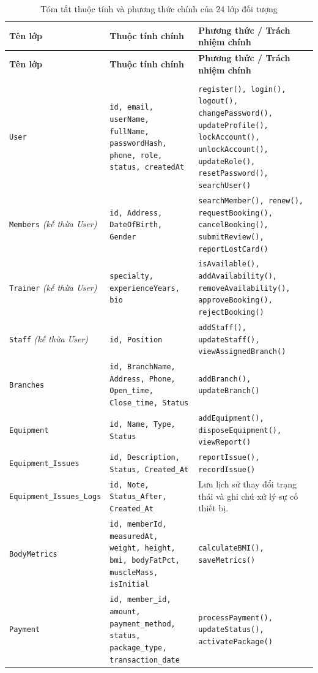\documentclass[a4paper,12pt]{article}
\begin{document}
{\small
\setlength{\tabcolsep}{4pt}
\begin{longtable}{|L{3.4cm}|L{5.3cm}|L{6.5cm}|}
\hline
\textbf{Tên lớp} & \textbf{Thuộc tính chính} & \textbf{Phương thức / Trách nhiệm chính} \\ \hline
\endfirsthead
\hline
\textbf{Tên lớp} & \textbf{Thuộc tính chính} & \textbf{Phương thức / Trách nhiệm chính} \\ \hline
\endhead
\hline
\endfoot
\hline
\caption{Tóm tắt thuộc tính và phương thức chính của 24 lớp đối tượng} \\
\endlastfoot
\texttt{User} & \texttt{id, email, userName, fullName, passwordHash, phone, role, status, createdAt} & \texttt{register(), login(), logout(), changePassword(), updateProfile(), lockAccount(), unlockAccount(), updateRole(), resetPassword(), searchUser()} \\ \hline
\texttt{Members} \textit{(kế thừa User)} & \texttt{id, Address, DateOfBirth, Gender} & \texttt{searchMember(), renew(), requestBooking(), cancelBooking(), submitReview(), reportLostCard()} \\ \hline
\texttt{Trainer} \textit{(kế thừa User)} & \texttt{specialty, experienceYears, bio} & \texttt{isAvailable(), addAvailability(), removeAvailability(), approveBooking(), rejectBooking()} \\ \hline
\texttt{Staff} \textit{(kế thừa User)} & \texttt{id, Position} & \texttt{addStaff(), updateStaff(), viewAssignedBranch()} \\ \hline
\texttt{Branches} & \texttt{id, BranchName, Address, Phone, Open\_time, Close\_time, Status} & \texttt{addBranch(), updateBranch()} \\ \hline
\texttt{Equipment} & \texttt{id, Name, Type, Status} & \texttt{addEquipment(), disposeEquipment(), viewReport()} \\ \hline
\texttt{Equipment\_Issues} & \texttt{id, Description, Status, Created\_At} & \texttt{reportIssue(), recordIssue()} \\ \hline
\texttt{Equipment\_Issues\_Logs} & \texttt{id, Note, Status\_After, Created\_At} & Lưu lịch sử thay đổi trạng thái và ghi chú xử lý sự cố thiết bị. \\ \hline
\texttt{BodyMetrics} & \texttt{id, memberId, measuredAt, weight, height, bmi, bodyFatPct, muscleMass, isInitial} & \texttt{calculateBMI(), saveMetrics()} \\ \hline
\texttt{Payment} & \texttt{id, member\_id, amount, payment\_method, status, package\_type, transaction\_date} & \texttt{processPayment(), updateStatus(), activatePackage()} \\ \hline

\end{longtable}}
\end{document}
